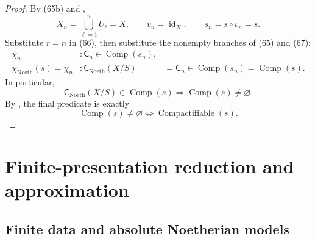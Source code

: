 \begin{proof}
  By (65b) and ,
  \[
    X_n=\bigcup_{\ell=1}^nU_\ell=X,\qquad
    v_n=\operatorname{id}_X,\qquad
    s_n=s\circ v_n=s.                                            \tag{67}
  \]
  Substitute $r=n$ in (66), then substitute the nonempty branches of (65)
  and (67):
  \[
  \begin{aligned}
    \chi_n&\colon\mathsf C_n\in\operatorname{Comp}(s_n),\\
    \chi_{\mathrm{Noeth}}(s)=\chi_n&\colon
    \mathsf C_{\mathrm{Noeth}}(X/S)
      &=\mathsf C_n
       \in\operatorname{Comp}(s_n)
       =\operatorname{Comp}(s).
  \end{aligned}
  \]
  In particular,
  \[
    \mathsf C_{\mathrm{Noeth}}(X/S)\in\operatorname{Comp}(s)
      \Longrightarrow\operatorname{Comp}(s)\neq\varnothing.
  \]
  By , the final predicate is exactly
  \[
    \operatorname{Comp}(s)\neq\varnothing
      \Longleftrightarrow\operatorname{Compactifiable}(s).
  \]
\end{proof}

\section{Finite-presentation reduction and approximation}

\subsection{Finite data and absolute Noetherian models}

